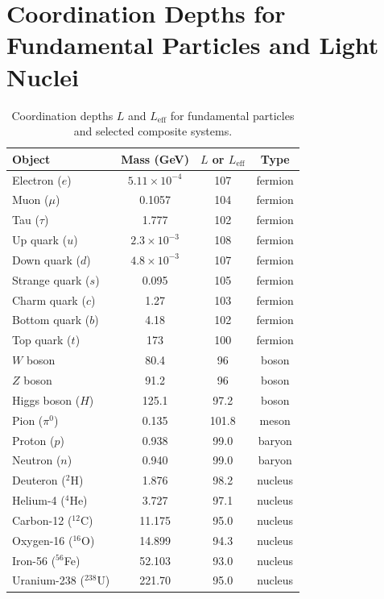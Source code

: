 \documentclass[11pt,a4paper]{article}
\begin{document}
	\section*{Coordination Depths for Fundamental Particles and Light Nuclei}
	\begin{table}[H]
		\centering
		\caption{Coordination depths \(L\) and \(L_{\mathrm{eff}}\) for fundamental particles and selected composite systems.}
		\label{tab:depths_particles}
		\small
		\begin{tabular}{l c c c}
			\toprule
			\textbf{Object} & \textbf{Mass (GeV)} & \textbf{\(L\) or \(L_{\mathrm{eff}}\)} & \textbf{Type} \\
			\midrule
			Electron (\(e\)) & \(5.11\times10^{-4}\) & 107 & fermion \\
			Muon (\(\mu\)) & 0.1057 & 104 & fermion \\
			Tau (\(\tau\)) & 1.777 & 102 & fermion \\
			Up quark (\(u\)) & \(2.3\times10^{-3}\) & 108 & fermion \\
			Down quark (\(d\)) & \(4.8\times10^{-3}\) & 107 & fermion \\
			Strange quark (\(s\)) & 0.095 & 105 & fermion \\
			Charm quark (\(c\)) & 1.27 & 103 & fermion \\
			Bottom quark (\(b\)) & 4.18 & 102 & fermion \\
			Top quark (\(t\)) & 173 & 100 & fermion \\
			\(W\) boson & 80.4 & 96 & boson \\
			\(Z\) boson & 91.2 & 96 & boson \\
			Higgs boson (\(H\)) & 125.1 & 97.2 & boson \\
			Pion (\(\pi^0\)) & 0.135 & 101.8 & meson \\
			Proton (\(p\)) & 0.938 & 99.0 & baryon \\
			Neutron (\(n\)) & 0.940 & 99.0 & baryon \\
			Deuteron (\(^2\)H) & 1.876 & 98.2 & nucleus \\
			Helium-4 (\(^4\)He) & 3.727 & 97.1 & nucleus \\
			Carbon-12 (\(^{12}\)C) & 11.175 & 95.0 & nucleus \\
			Oxygen-16 (\(^{16}\)O) & 14.899 & 94.3 & nucleus \\
			Iron-56 (\(^{56}\)Fe) & 52.103 & 93.0 & nucleus \\
			Uranium-238 (\(^{238}\)U) & 221.70 & 95.0 & nucleus \\
			\bottomrule
		\end{tabular}
	\end{table}
	
\end{document}
